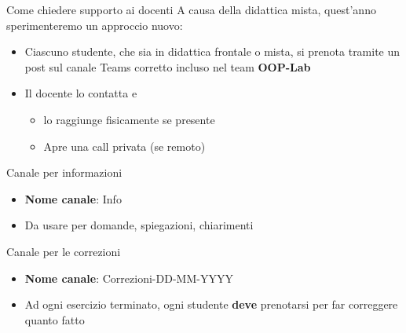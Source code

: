 \documentclass[xcolor=dvipsnames,presentation]{beamer}
\begin{document}
\begin{frame}{Come chiedere supporto ai docenti}
    A causa della didattica mista, quest'anno sperimenteremo un approccio nuovo:
    \begin{itemize}
        \item Ciascuno studente, che sia in didattica frontale o mista, si prenota tramite un post sul canale Teams corretto incluso nel team \textbf{OOP-Lab}
        \item Il docente lo contatta e
        \begin{itemize}
            \item lo raggiunge fisicamente se presente
            \item Apre una call privata (se remoto)
        \end{itemize}
    \end{itemize}
    \begin{block}{Canale per informazioni}
        \begin{itemize}
            \item \textbf{Nome canale}: Info
            \item Da usare per domande, spiegazioni, chiarimenti
        \end{itemize}
    \end{block}
    \begin{block}{Canale per le correzioni}
        \begin{itemize}
            \item \textbf{Nome canale}: Correzioni-DD-MM-YYYY
            \item Ad ogni esercizio terminato, ogni studente \textbf{deve} prenotarsi per far correggere quanto fatto
        \end{itemize}
    \end{block}
\end{frame}
\end{document}
